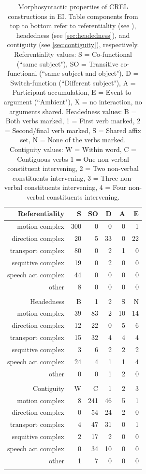 \begin{table}
\centering
\begin{tabular}{rrrrrr}
  \lsptoprule
Referentiality & S & SO & D & A & E \\ 
  \midrule
motion complex & 300 &   0 &   0 &   0 &   1 \\ 
  direction complex &  20 &   5 &  33 &   0 &  22 \\ 
  transport complex &  80 &   0 &   2 &   1 &   0 \\ 
  sequitive complex &  19 &   0 &   2 &   0 &   0 \\ 
  speech act complex &  44 &   0 &   0 &   0 &   0 \\ 
  other &   8 &   0 &   0 &   0 &   0 \\ 
   \midrule
 \\
  \midrule
Headedness & B & 1 & 2 & S & N \\ 
  \midrule
motion complex &  39 &  83 &   2 &  10 &  14 \\ 
  direction complex &  12 &  22 &   0 &   5 &   6 \\ 
  transport complex &  15 &  32 &   4 &   4 &   4 \\ 
  sequitive complex &   3 &   6 &   2 &   2 &   2 \\ 
  speech act complex &  24 &   4 &   1 &   1 &   4 \\ 
  other &   0 &   0 &   1 &   2 &   0 \\ 
   \midrule
 \\
  \midrule
Contiguity & W & C & 1 & 2 & 3 \\ 
  \midrule
motion complex &   8 & 241 &  46 &   5 &   1 \\ 
  direction complex &   0 &  54 &  24 &   2 &   0 \\ 
  transport complex &   4 &  47 &  31 &   0 &   1 \\ 
  sequitive complex &   2 &  17 &   2 &   0 &   0 \\ 
  speech act complex &   0 &  34 &  10 &   0 &   0 \\ 
  other &   1 &   7 &   0 &   0 &   0 \\ 
   \lspbottomrule
\end{tabular}
\caption[Morphosyntactic properties of CREL constructions]{Morphosyntactic properties of CREL constructions in EI. Table components from top to bottom refer to referentiality (see ), headedness (see \ref{sec:headedness}), and contiguity (see \ref{sec:contiguity}), respectively. Referentiality values: S = Co-functional (``same subject"), SO = Transitive co-functional (``same subject and object"), D = Switch-function (``Different subject"), A = Participant accumulation, E = Event-to-argument (``Ambient"), X = no interaction, no arguments shared. Headedness values: B = Both verbs marked, 1 = First verb marked, 2 = Second/final verb marked, S = Shared affix set, N = None of the verbs marked. Contiguity values: W = Within word, C = Contiguous verbs 1 = One non-verbal constituent intervening, 2 = Two non-verbal constituents intervening, 3 = Three non-verbal constituents intervening, 4 = Four non-verbal constituents intervening.}
\label{table:crel_formal}
\end{table}

